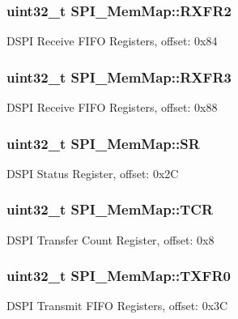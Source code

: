 \subsubsection[{R\+X\+F\+R2}]{\setlength{\rightskip}{0pt plus 5cm}uint32\+\_\+t S\+P\+I\+\_\+\+Mem\+Map\+::\+R\+X\+F\+R2}\label{struct_s_p_i___mem_map_a3839ee0fb2cf1f0389bdaf447dcd6760}
D\+S\+P\+I Receive F\+I\+F\+O Registers, offset\+: 0x84 \hypertarget{struct_s_p_i___mem_map_adb8a4cbc6bff3380d9e817e5bb0e4fee}{}
\subsubsection[{R\+X\+F\+R3}]{\setlength{\rightskip}{0pt plus 5cm}uint32\+\_\+t S\+P\+I\+\_\+\+Mem\+Map\+::\+R\+X\+F\+R3}\label{struct_s_p_i___mem_map_adb8a4cbc6bff3380d9e817e5bb0e4fee}
D\+S\+P\+I Receive F\+I\+F\+O Registers, offset\+: 0x88 \hypertarget{struct_s_p_i___mem_map_a1cd4975403798b364632d0e9af310962}{}
\subsubsection[{S\+R}]{\setlength{\rightskip}{0pt plus 5cm}uint32\+\_\+t S\+P\+I\+\_\+\+Mem\+Map\+::\+S\+R}\label{struct_s_p_i___mem_map_a1cd4975403798b364632d0e9af310962}
D\+S\+P\+I Status Register, offset\+: 0x2\+C \hypertarget{struct_s_p_i___mem_map_ab92eb6630f7fe6309c605f0155c3a4c9}{}
\subsubsection[{T\+C\+R}]{\setlength{\rightskip}{0pt plus 5cm}uint32\+\_\+t S\+P\+I\+\_\+\+Mem\+Map\+::\+T\+C\+R}\label{struct_s_p_i___mem_map_ab92eb6630f7fe6309c605f0155c3a4c9}
D\+S\+P\+I Transfer Count Register, offset\+: 0x8 \hypertarget{struct_s_p_i___mem_map_aa234b528e26469e3bafea1dfecff1dfe}{}
\subsubsection[{T\+X\+F\+R0}]{\setlength{\rightskip}{0pt plus 5cm}uint32\+\_\+t S\+P\+I\+\_\+\+Mem\+Map\+::\+T\+X\+F\+R0}\label{struct_s_p_i___mem_map_aa234b528e26469e3bafea1dfecff1dfe}
D\+S\+P\+I Transmit F\+I\+F\+O Registers, offset\+: 0x3\+C \hypertarget{struct_s_p_i___mem_map_aa4c8bc4c6c43cb03d266084ead4948f6}{}
